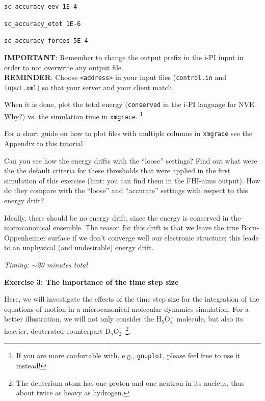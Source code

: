 \documentclass[a4paper,11pt]{scrartcl}
\begin{document}
\begin{itemize}
\begin{center}
\texttt{sc\_accuracy\_eev  1E-4}

\texttt{sc\_accuracy\_etot 1E-6}

\texttt{sc\_accuracy\_forces 5E-4}
\end{center}
\textbf{IMPORTANT}: Remember to change the output prefix in the i-PI input in order to not overwrite any output file.
\vspace{0.1cm}\\
\textbf{REMINDER}: Choose \texttt{<address>} in your input files (\texttt{control.in} and \texttt{input.xml}) so that your server and your client  match.

\vspace{0.1cm}
When it is done, plot the total energy (\texttt{conserved} in the i-PI language for NVE. Why?)  vs. the simulation time in \texttt{xmgrace}.
\footnote{If you are more confortable with, e.g., \texttt{gnuplot}, please feel free to use it instead!}

For a short guide on how to plot files with multiple columns in \texttt{xmgrace}  see the Appendix to	 this tutorial.

Can you see how the energy drifts with the ``loose'' settings? Find out what were the the default criteria for these thresholds that were applied in the first simulation of this exercise (hint: you can find them in the FHI-aims output). How do they compare with the ``loose'' and ``accurate'' settings with respect to this energy drift? 


\end{itemize}

\vspace{0.4cm}
Ideally, there should be no energy drift, since the energy is conserved in the microcanonical ensemble.
 The reason for this drift is that we leave the true Born-Oppenheimer surface if we don't converge well our 
electronic structure; this leads to an unphysical (and undesirable) energy drift.

\textit{Timing:  $\sim$20 minutes total}

\clearpage


{\large\textbf{Exercise 3: The importance of the time step size}}

Here, we will investigate the effects of the time step size for the integration of the
equations of motion in a microcanonical molecular dynamics simulation.
For a better illustration, we will not only consider the H$_5$O$_2^+$ molecule, but also its heavier,
deuterated counterpart D$_5$O$_2^+$ \footnote{The deuterium atom has one proton and one neutron in its nucleus,
thus about twice as heavy as hydrogen.}.
\end{document}
